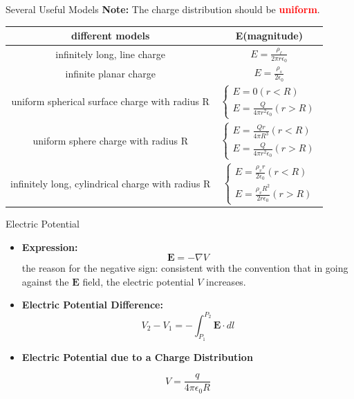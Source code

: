 \documentclass[xcolor={dvipsnames}]{beamer}
\begin{document}
\begin{frame}{Several Useful Models}
\textbf{Note:} The charge distribution should be \textcolor{red}{\textbf{uniform}}.
\begin{table}[H]
  \centering
    \begin{tabular}{cc}
      \hline
   different models & E(magnitude)\\ \hline
    infinitely long, line charge &$E=\frac{ \rho_{\ell}}{ 2\pi r \epsilon_0} $ \\   \hline
    infinite planar charge &  $E=\frac{\rho_s}{2\epsilon_0}$\\   \hline
    uniform spherical surface charge with radius R & $\left\{\begin{array}{l}E=0(r<R) \\ E=\frac{Q}{4\pi r^2 \epsilon_0} (r>R)\end{array}\right.$ \\   \hline
    uniform sphere charge with radius R & $\left\{\begin{array}{l}E=\frac{Qr}{4\pi R^3}(r<R) \\ E=\frac{Q}{4\pi r^2 \epsilon_0} (r>R)\end{array}\right.$ \\   \hline
    infinitely long, cylindrical charge with radius R & $\left\{\begin{array}{l}E=\frac{\rho_v r}{2\epsilon_0}(r<R) \\ E=\frac{\rho_v R^2}{2r\epsilon_0} (r>R)\end{array}\right.$ \\   \hline
    \end{tabular}%
  \label{tab:addlabel}%
\end{table}%
\end{frame}
\begin{frame}{Electric Potential}
\begin{itemize}
\item \textbf{Expression:}
\[
\mathbf{E}=-\nabla V
\]
the reason for the negative sign: consistent with the convention that in going against the $\mathbf{E}$ field, the electric potential $V$ increases.

\item \textbf{Electric Potential Difference:}
\[
V_{2}-V_{1}=-\int_{P_{1}}^{P_{2}} \mathbf{E} \cdot dl
\]
\item \textbf{Electric Potential due to a Charge Distribution}

$$V = \frac{q}{4\pi \epsilon_0 R}$$
\end{itemize}
\end{frame}
\end{document}
